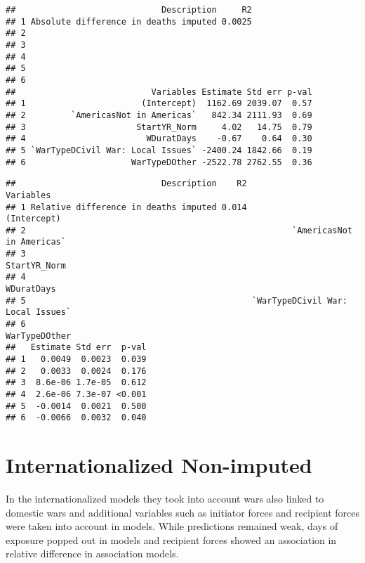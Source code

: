 \documentclass[
]{article}
\begin{document}
\begin{verbatim}
##                             Description     R2
## 1 Absolute difference in deaths imputed 0.0025
## 2                                             
## 3                                             
## 4                                             
## 5                                             
## 6                                             
##                           Variables Estimate Std err p-val
## 1                       (Intercept)  1162.69 2039.07  0.57
## 2         `AmericasNot in Americas`   842.34 2111.93  0.69
## 3                      StartYR_Norm     4.02   14.75  0.79
## 4                        WDuratDays    -0.67    0.64  0.30
## 5 `WarTypeDCivil War: Local Issues` -2400.24 1842.66  0.19
## 6                     WarTypeDOther -2522.78 2762.55  0.36
\end{verbatim}

\begin{verbatim}
##                             Description    R2                         Variables
## 1 Relative difference in deaths imputed 0.014                       (Intercept)
## 2                                                     `AmericasNot in Americas`
## 3                                                                  StartYR_Norm
## 4                                                                    WDuratDays
## 5                                             `WarTypeDCivil War: Local Issues`
## 6                                                                 WarTypeDOther
##   Estimate Std err  p-val
## 1   0.0049  0.0023  0.039
## 2   0.0033  0.0024  0.176
## 3  8.6e-06 1.7e-05  0.612
## 4  2.6e-06 7.3e-07 <0.001
## 5  -0.0014  0.0021  0.500
## 6  -0.0066  0.0032  0.040
\end{verbatim}

\hypertarget{internationalized-non-imputed}{%
\section{Internationalized
Non-imputed}\label{internationalized-non-imputed}}

In the internationalized models they took into account wars also linked
to domestic wars and additional variables such as initiator forces and
recipient forces were taken into account in models. While predictions
remained weak, days of exposure popped out in models and recipient
forces showed an association in relative difference in association
models.
\end{document}
